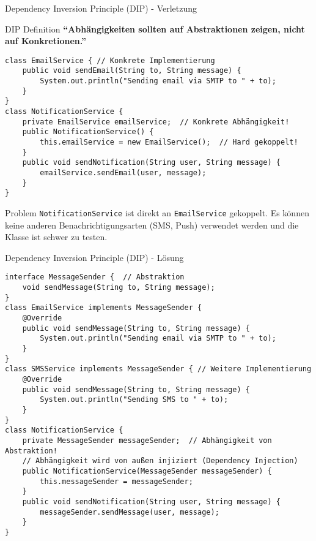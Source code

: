\begin{frame}[fragile]{Dependency Inversion Principle (DIP) - Verletzung}
  \begin{exampleblock}{DIP Definition}
    \textbf{``Abhängigkeiten sollten auf Abstraktionen zeigen, nicht auf Konkretionen.''}
  \end{exampleblock}
  \begin{lstlisting}[style=java, basicstyle=\tiny\ttfamily]
class EmailService { // Konkrete Implementierung
    public void sendEmail(String to, String message) {
        System.out.println("Sending email via SMTP to " + to);
    }
}
class NotificationService {
    private EmailService emailService;  // Konkrete Abhängigkeit!
    public NotificationService() {
        this.emailService = new EmailService();  // Hard gekoppelt!
    }
    public void sendNotification(String user, String message) {
        emailService.sendEmail(user, message);
    }
}
  \end{lstlisting}
  \begin{alertblock}{Problem}
    \texttt{NotificationService} ist direkt an \texttt{EmailService} gekoppelt. Es können keine anderen Benachrichtigungsarten (SMS, Push) verwendet werden und die Klasse ist schwer zu testen.
  \end{alertblock}
\end{frame}

\begin{frame}[fragile]{Dependency Inversion Principle (DIP) - Lösung}
  \begin{lstlisting}[style=java, basicstyle=\tiny\ttfamily]
interface MessageSender {  // Abstraktion
    void sendMessage(String to, String message);
}
class EmailService implements MessageSender {
    @Override
    public void sendMessage(String to, String message) {
        System.out.println("Sending email via SMTP to " + to);
    }
}
class SMSService implements MessageSender { // Weitere Implementierung
    @Override
    public void sendMessage(String to, String message) {
        System.out.println("Sending SMS to " + to);
    }
}
class NotificationService {
    private MessageSender messageSender;  // Abhängigkeit von Abstraktion!
    // Abhängigkeit wird von außen injiziert (Dependency Injection)
    public NotificationService(MessageSender messageSender) {
        this.messageSender = messageSender;
    }
    public void sendNotification(String user, String message) {
        messageSender.sendMessage(user, message);
    }
}
  \end{lstlisting}
\end{frame}


